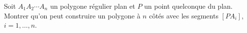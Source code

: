 Soit $A_1A_2 \cdots A_n$ un polygone régulier plan et $P$ un point quelconque du plan. Montrer qu'on peut construire un polygone à $n$ côtés avec les segments $[PA_i]$, $i = 1, \ldots, n$.
